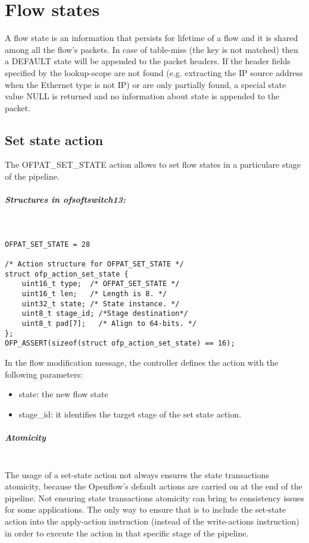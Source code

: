 \chapter{Flow states}
\label{chap:flow_states}
A flow state is an information that persists for lifetime of a flow and it is shared among all the flow's packets.
In case of table-miss (the key is not matched) then a DEFAULT state will be appended to the packet headers.
If the header fields specified by the lookup-scope are not found (e.g. extracting the IP source address when the Ethernet type is not IP) or are only partially found, a special state value NULL is returned and no information about state is appended to the packet.

\section{Set state action}
\label{sec:act_set_state}
The OFPAT\_SET\_STATE action allows to set flow states in a particulare stage of the pipeline.

\paragraph{Structures in ofsoftswitch13:}\mbox{}\\
\begin{lstlisting}[style=customc]
OFPAT_SET_STATE = 28

/* Action structure for OFPAT_SET_STATE */
struct ofp_action_set_state {
    uint16_t type;  /* OFPAT_SET_STATE */
    uint16_t len;   /* Length is 8. */
    uint32_t state; /* State instance. */
    uint8_t stage_id; /*Stage destination*/
    uint8_t pad[7];   /* Align to 64-bits. */
};
OFP_ASSERT(sizeof(struct ofp_action_set_state) == 16);

\end{lstlisting}
In the flow modification message, the controller defines the action with the following parameters:

\begin{itemize}
\setlength\itemsep{0em}
\item state: the new flow state
\item stage\_id: it identifies the target stage of the set state action.
\end{itemize}
\paragraph{Atomicity}\mbox{}\\
The usage of a set-state action not always ensures the state transactions atomicity, because the Openflow’s default actions are carried on at the end of the pipeline. Not ensuring state transactions atomicity can bring to consistency issues for some applications. The only way to ensure that is to include the set-state action into the apply-action instruction (instead of the write-actions instruction) in order to execute the action in that specific stage of the pipeline.
